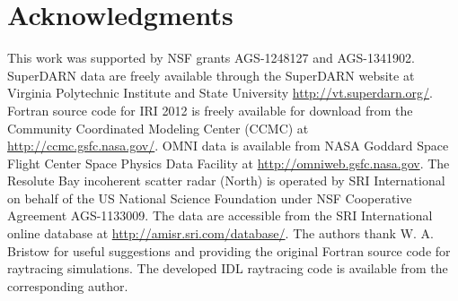 \section*{Acknowledgments}
This work was supported by NSF grants AGS-1248127 and AGS-1341902. SuperDARN data are freely available through the SuperDARN website at Virginia Polytechnic Institute and State University \url{http://vt.superdarn.org/}. Fortran source code for IRI 2012 is freely available for download from the Community Coordinated Modeling Center (CCMC) at \url{http://ccmc.gsfc.nasa.gov/}. OMNI data is available from NASA Goddard Space Flight Center Space Physics Data Facility at \url{http://omniweb.gsfc.nasa.gov}. The Resolute Bay incoherent scatter radar (North) is operated by SRI International on behalf of the US National Science Foundation under NSF Cooperative Agreement AGS-1133009. The data are accessible from the SRI International online database at \url{http://amisr.sri.com/database/}. The authors thank W. A. Bristow for useful suggestions and providing the original Fortran source code for raytracing simulations. The developed IDL raytracing code is available from the corresponding author.






